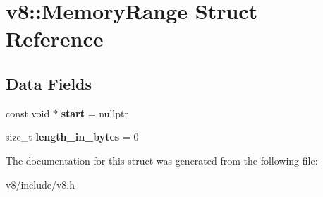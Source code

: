 \hypertarget{structv8_1_1MemoryRange}{}\section{v8\+:\+:Memory\+Range Struct Reference}
\label{structv8_1_1MemoryRange}
\subsection*{Data Fields}
\begin{DoxyCompactItemize}
\item 
\mbox{\label{structv8_1_1MemoryRange_a3dea80a77e98bb0b9ff20fa27cb13280}} 
const void $\ast$ {\bfseries start} = nullptr
\item 
\mbox{\label{structv8_1_1MemoryRange_a03b4862f20703ce8b94c30850451b870}} 
size\+\_\+t {\bfseries length\+\_\+in\+\_\+bytes} = 0
\end{DoxyCompactItemize}


The documentation for this struct was generated from the following file\+:\begin{DoxyCompactItemize}
\item 
v8/include/v8.\+h\end{DoxyCompactItemize}
